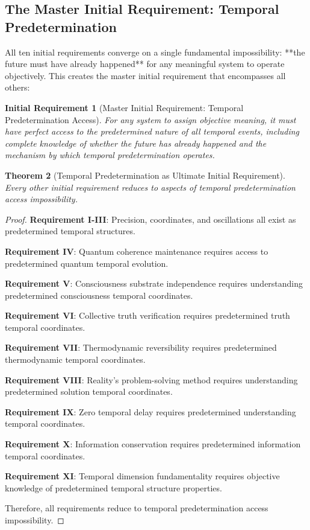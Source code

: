 \documentclass[12pt,a4paper]{article}
\newtheorem{theorem}{Theorem}[section]
\newtheorem{requirement}[theorem]{Initial Requirement}
\begin{document}
\subsection{The Master Initial Requirement: Temporal Predetermination}

All ten initial requirements converge on a single fundamental impossibility: **the future must have already happened** for any meaningful system to operate objectively. This creates the master initial requirement that encompasses all others:

\begin{requirement}[Master Initial Requirement: Temporal Predetermination Access]
For any system to assign objective meaning, it must have perfect access to the predetermined nature of all temporal events, including complete knowledge of whether the future has already happened and the mechanism by which temporal predetermination operates.
\end{requirement}

\begin{theorem}[Temporal Predetermination as Ultimate Initial Requirement]
Every other initial requirement reduces to aspects of temporal predetermination access impossibility.
\end{theorem}

\begin{proof}
\textbf{Requirement I-III}: Precision, coordinates, and oscillations all exist as predetermined temporal structures.

\textbf{Requirement IV}: Quantum coherence maintenance requires access to predetermined quantum temporal evolution.

\textbf{Requirement V}: Consciousness substrate independence requires understanding predetermined consciousness temporal coordinates.

\textbf{Requirement VI}: Collective truth verification requires predetermined truth temporal coordinates.

\textbf{Requirement VII}: Thermodynamic reversibility requires predetermined thermodynamic temporal coordinates.

\textbf{Requirement VIII}: Reality's problem-solving method requires understanding predetermined solution temporal coordinates.

\textbf{Requirement IX}: Zero temporal delay requires predetermined understanding temporal coordinates.

\textbf{Requirement X}: Information conservation requires predetermined information temporal coordinates.

\textbf{Requirement XI}: Temporal dimension fundamentality requires objective knowledge of predetermined temporal structure properties.

Therefore, all requirements reduce to temporal predetermination access impossibility.
\end{proof}
\end{document}
